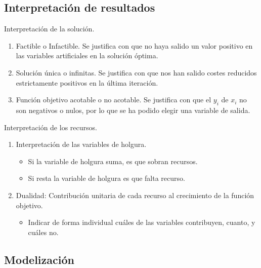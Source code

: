 \documentclass[12pt, twoside, openright]{report} %
\begin{document}
\subsection{Interpretación de resultados}

Interpretación de la solución.

\begin{enumerate}
	\item Factible o Infactible. Se justifica con que no haya salido un valor positivo en las variables artificiales en la solución óptima.
	\item Solución única o infinitas. Se justifica con que nos han salido
	costes reducidos estrictamente positivos en la última iteración.
 	\item Función objetivo acotable o no acotable. Se justifica con que el
	\(y_i\) de \(x_i\) no son negativos o nulos, por lo que se ha
	podido elegir una variable de salida.
\end{enumerate}

Interpretación de los recursos.

\begin{enumerate}
	\item Interpretación de las variables de holgura.
	\begin{itemize}
		\item Si la variable de holgura suma, es que sobran recursos.
		\item Si resta la variable de holgura es que falta recurso.
	\end{itemize}
	\item Dualidad: Contribución unitaria de cada recurso al crecimiento de
	la función objetivo.

	\begin{itemize}
	\item Indicar de forma individual cuáles de las variables contribuyen,
		cuanto, y cuáles no.
	\end{itemize}
\end{enumerate}
\pagebreak
\subsection{Modelización}
\end{document}
